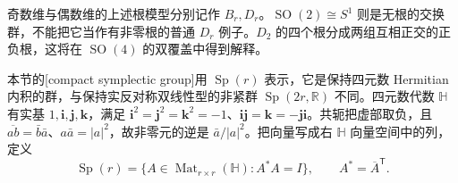 奇数维与偶数维的上述根模型分别记作 \(B_r,D_r\)。\(\operatorname{SO}(2)\cong S^1\) 则是无根的交换群，不能把它当作有非零根的普通 \(D_r\) 例子。\(D_2\) 的四个根分成两组互相正交的正负根，这将在 \(\operatorname{SO}(4)\) 的双覆盖中得到解释。

\ProseParagraphBreak

本节的[compact symplectic group]用 \(\operatorname{Sp}(r)\) 表示，它是保持四元数 Hermitian 内积的群，与保持实反对称双线性型的非紧群 \(\operatorname{Sp}(2r,\mathbb R)\) 不同。四元数代数 \(\mathbb H\) 有实基 \(1,\mathbf i,\mathbf j,\mathbf k\)，满足 \(\mathbf i^2=\mathbf j^2=\mathbf k^2=-1\)、\(\mathbf i\mathbf j=\mathbf k=-\mathbf j\mathbf i\)。共轭把虚部取负，且 \(\overline{ab}=\bar b\bar a\)、\(a\bar a=|a|^2\)，故非零元的逆是 \(\bar a/|a|^2\)。把向量写成右 \(\mathbb H\) 向量空间中的列，定义
\[
	\operatorname{Sp}(r)=\{A\in\operatorname{Mat}_{r\times r}(\mathbb H):A^*A=I\},\qquad A^*=\overline A^{\mathsf T}.
\]

